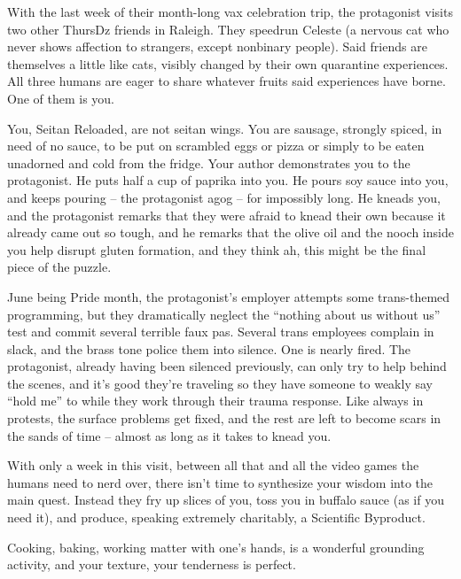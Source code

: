 \documentclass[12pt]{article}
\begin{document}
With the last week of their month-long vax celebration trip,
the protagonist visits two other ThursDz friends in Raleigh.
They speedrun Celeste (a nervous cat who never shows affection to strangers, except nonbinary people).
Said friends are themselves a little like cats, visibly changed by their own quarantine experiences.
All three humans are eager to share whatever fruits said experiences have borne.
One of them is you.

You, Seitan Reloaded, are not seitan wings.
You are sausage, strongly spiced, in need of no sauce,
to be put on scrambled eggs or pizza or simply to be eaten unadorned and cold from the fridge.
Your author demonstrates you to the protagonist.
He puts half a cup of paprika into you.
He pours soy sauce into you, and keeps pouring -- the protagonist agog -- for impossibly long.
He kneads you,
and the protagonist remarks that they were afraid to knead their own because it already came out so tough,
and he remarks that the olive oil and the nooch inside you help disrupt gluten formation,
and they think ah, this might be the final piece of the puzzle.

June being Pride month,
the protagonist's employer attempts some trans-themed programming,
but they dramatically neglect the ``nothing about us without us'' test
and commit several terrible faux pas.
Several trans employees complain in slack,
and the brass tone police them into silence.
One is nearly fired.
The protagonist, already having been silenced previously,
can only try to help behind the scenes,
and it's good they're traveling so they have someone to weakly say ``hold me'' to
while they work through their trauma response.
Like always in protests, the surface problems get fixed, and the rest are left to become scars in the sands of time -- almost as long as it takes to knead you.

With only a week in this visit, between all that and all the video games the humans need to nerd over, there isn't time to synthesize your wisdom into the main quest.
Instead they fry up slices of you, toss you in buffalo sauce (as if you need it),
and produce, speaking extremely charitably, a Scientific Byproduct.

Cooking, baking, working matter with one's hands, is a wonderful grounding activity,
and your texture, your tenderness is perfect.

\end{document}
